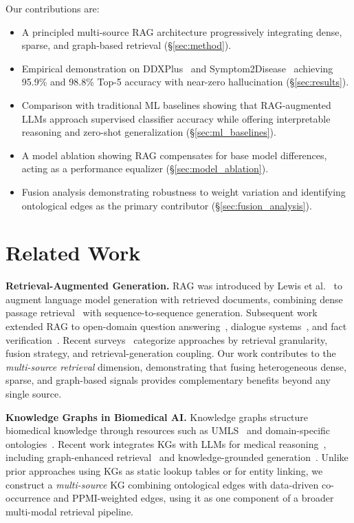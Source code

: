 \documentclass[runningheads]{llncs}
\begin{document}
Our contributions are:
\begin{itemize}
    \item A principled multi-source RAG architecture progressively integrating dense, sparse, and graph-based retrieval (\S\ref{sec:method}).
    \item Empirical demonstration on DDXPlus~\cite{fansi2022ddxplus} and Symptom2Disease~\cite{gretelai_s2d} achieving 95.9\% and 98.8\% Top-5 accuracy with near-zero hallucination (\S\ref{sec:results}).
    \item Comparison with traditional ML baselines showing that RAG-augmented LLMs approach supervised classifier accuracy while offering interpretable reasoning and zero-shot generalization (\S\ref{sec:ml_baselines}).
    \item A model ablation showing RAG compensates for base model differences, acting as a performance equalizer (\S\ref{sec:model_ablation}).
    \item Fusion analysis demonstrating robustness to weight variation and identifying ontological edges as the primary contributor (\S\ref{sec:fusion_analysis}).
\end{itemize}

\section{Related Work}
\label{sec:related}

\textbf{Retrieval-Augmented Generation.} RAG was introduced by Lewis et al.~\cite{lewis2020retrieval} to augment language model generation with retrieved documents, combining dense passage retrieval~\cite{karpukhin2020dense} with sequence-to-sequence generation. Subsequent work extended RAG to open-domain question answering~\cite{izacard2021leveraging}, dialogue systems~\cite{shuster2021retrieval}, and fact verification~\cite{thorne2018fever}. Recent surveys~\cite{gao2023retrieval,zhao2024retrieval} categorize approaches by retrieval granularity, fusion strategy, and retrieval-generation coupling. Our work contributes to the \emph{multi-source retrieval} dimension, demonstrating that fusing heterogeneous dense, sparse, and graph-based signals provides complementary benefits beyond any single source.

\textbf{Knowledge Graphs in Biomedical AI.} Knowledge graphs structure biomedical knowledge through resources such as UMLS~\cite{bodenreider2004unified} and domain-specific ontologies~\cite{santos2022knowledge,chandak2023building}. Recent work integrates KGs with LLMs for medical reasoning~\cite{pan2024unifying}, including graph-enhanced retrieval~\cite{he2024gretriever} and knowledge-grounded generation~\cite{yasunaga2022deep}. Unlike prior approaches using KGs as static lookup tables or for entity linking, we construct a \emph{multi-source} KG combining ontological edges with data-driven co-occurrence and PPMI-weighted edges, using it as one component of a broader multi-modal retrieval pipeline.
\end{document}

